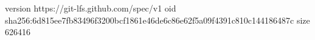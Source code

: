 version https://git-lfs.github.com/spec/v1
oid sha256:6d815ee7fb83496f3200bcf1861e46de6c86e62f5a09f4391c810c144186487c
size 626416
